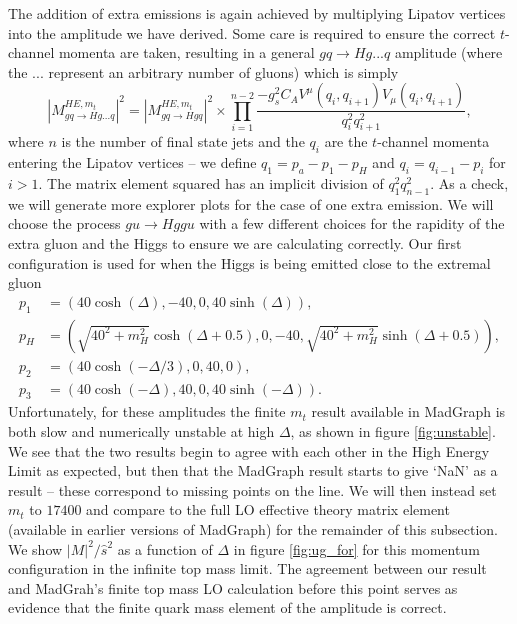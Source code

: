 The addition of extra emissions is again achieved by multiplying Lipatov vertices into the amplitude we have derived. Some care is required to ensure the correct $t$-channel momenta are taken, resulting in a general $gq\to Hg...q$ amplitude (where the ... represent an arbitrary number of gluons) which is simply
\begin{equation}
|M_{gq \to Hg...q}^{HE,m_t}|^2 = |M_{gq \to Hgq}^{HE,m_t}|^2 \times \prod_{i=1}^{n-2} \frac{-g_s^2C_A V^\mu(q_i, q_{i+1}) V_\mu(q_i, q_{i+1})}{q_i^2 q_{i+1}^2},
\end{equation}
where $n$ is the number of final state jets and the $q_i$ are the $t$-channel momenta entering the Lipatov vertices -- we define $q_1 = p_a - p_1 -p_H$ and $q_i = q_{i-1} - p_i$ for $i >1$. The matrix element squared has an implicit division of $q_1^2 q_{n-1}^2$. As a check, we will generate more explorer plots for the case of one extra emission. We will choose the process $gu \to Hggu$ with a few different choices for the rapidity of the extra gluon and the Higgs to ensure we are calculating correctly. Our first configuration is used for when the Higgs is being emitted close to the extremal gluon
\begin{subequations}
\begin{align}
p_1 &= (40 \cosh(\Delta),-40,0,40 \sinh(\Delta)), \\
p_H &= (\sqrt{40^2+m_H^2} \cosh(\Delta+0.5), 0,-40,\sqrt{40^2+m_H^2}  \sinh(\Delta+0.5)), \\
p_2 &= (40 \cosh(-\Delta/3),0,40,0), \\
p_3 &= (40 \cosh(-\Delta),40,0,40 \sinh(-\Delta)).
\end{align}
\end{subequations}
Unfortunately, for these amplitudes the finite $m_t$ result available in MadGraph is both slow and numerically unstable at high $\Delta$, as shown in figure \ref{fig:unstable}. We see that the two results begin to agree with each other in the High Energy Limit as expected, but then that the MadGraph result starts to give `NaN' as a result -- these correspond to missing points on the line. We will then instead set $m_t$ to $17400$ and compare to the full LO effective theory matrix element (available in earlier versions of MadGraph) for the remainder of this subsection. We show $|M|^2/\hat{s}^2$ as a function of $\Delta$ in figure \ref{fig:ug_for} for this momentum configuration in the infinite top mass limit. The agreement between our result and MadGrah's finite top mass LO calculation before this point serves as evidence that the finite quark mass element of the amplitude is correct.
